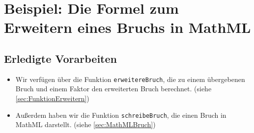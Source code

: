 \section{Beispiel: Die Formel zum Erweitern eines Bruchs in MathML}

\subsection*{Erledigte Vorarbeiten}

\begin{itemize}
	\item Wir verfügen über die Funktion \texttt{erweitereBruch}, die zu einem übergebenen Bruch und einem Faktor den erweiterten Bruch berechnet. (siehe \ref{sec:FunktionErweitern})
	\item Außerdem haben wir die Funktion \texttt{schreibeBruch}, die einen Bruch in MathML darstellt. (siehe \ref{sec:MathMLBruch})
\end{itemize}

